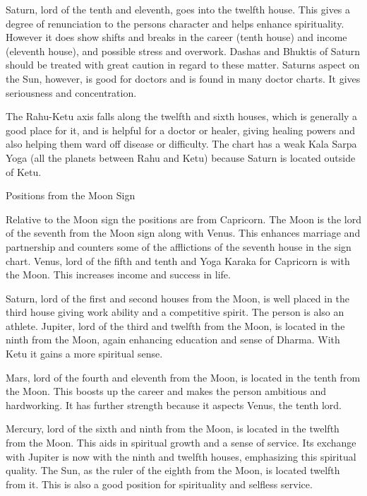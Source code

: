  

Saturn, lord of the tenth and eleventh, goes into the twelfth house. This gives a degree of renunciation to the persons character and helps enhance spirituality. However it does show shifts and breaks in the career (tenth house) and income (eleventh house), and possible stress and overwork. Dashas and Bhuktis of Saturn should be treated with great caution in regard to these matter. Saturns aspect on the Sun, however, is good for doctors and is found in many doctor charts. It gives seriousness and concentration.

 

The Rahu-Ketu axis falls along the twelfth and sixth houses, which is generally a good place for it, and is helpful for a doctor or healer, giving healing powers and also helping them ward off disease or difficulty. The chart has a weak Kala Sarpa Yoga (all the planets between Rahu and Ketu) because Saturn is located outside of Ketu.

 

Positions from the Moon Sign

 

Relative to the Moon sign the positions are from Capricorn. The Moon is the lord of the seventh from the Moon sign along with Venus. This enhances marriage and partnership and counters some of the afflictions of the seventh house in the sign chart. Venus, lord of the fifth and tenth and Yoga Karaka for Capricorn is with the Moon. This increases income and success in life.

 

Saturn, lord of the first and second houses from the Moon, is well placed in the third house giving work ability and a competitive spirit. The person is also an athlete. Jupiter, lord of the third and twelfth from the Moon, is located in the ninth from the Moon, again enhancing education and sense of Dharma. With Ketu it gains a more spiritual sense.

 

Mars, lord of the fourth and eleventh from the Moon, is located in the tenth from the Moon. This boosts up the career and makes the person ambitious and hardworking. It has further strength because it aspects Venus, the tenth lord.

 

Mercury, lord of the sixth and ninth from the Moon, is located in the twelfth from the Moon. This aids in spiritual growth and a sense of service. Its exchange with Jupiter is now with the ninth and twelfth houses, emphasizing this spiritual quality. The Sun, as the ruler of the eighth from the Moon, is located twelfth from it. This is also a good position for spirituality and selfless service.

